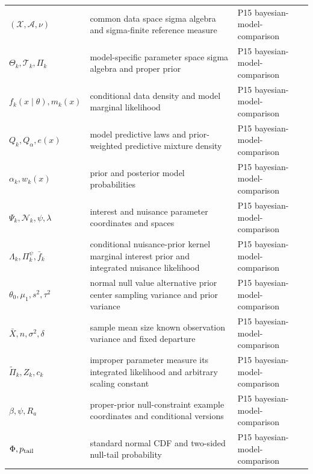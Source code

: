 \begin{longtable}{@{}p{}p{}p{}@{}}
\((\mathcal X,\allowbreak \mathcal A,\allowbreak \nu)\) & common data space sigma algebra and sigma-finite reference measure & P15 bayesian-\allowbreak{}model-\allowbreak{}comparison \\
\(\Theta_k,\allowbreak \mathcal T_k,\allowbreak \Pi_k\) & model-specific parameter space sigma algebra and proper prior & P15 bayesian-\allowbreak{}model-\allowbreak{}comparison \\
\(f_k(x\mid\theta),\allowbreak m_k(x)\) & conditional data density and model marginal likelihood & P15 bayesian-\allowbreak{}model-\allowbreak{}comparison \\
\(Q_k,\allowbreak Q_\alpha,\allowbreak e(x)\) & model predictive laws and prior-weighted predictive mixture density & P15 bayesian-\allowbreak{}model-\allowbreak{}comparison \\
\(\alpha_k,\allowbreak w_k(x)\) & prior and posterior model probabilities & P15 bayesian-\allowbreak{}model-\allowbreak{}comparison \\
\(\Psi_k,\allowbreak \mathcal N_k,\allowbreak \psi,\allowbreak \lambda\) & interest and nuisance parameter coordinates and spaces & P15 bayesian-\allowbreak{}model-\allowbreak{}comparison \\
\(\Lambda_k,\allowbreak \Pi_k^\psi,\allowbreak \bar f_k\) & conditional nuisance-prior kernel marginal interest prior and integrated nuisance likelihood & P15 bayesian-\allowbreak{}model-\allowbreak{}comparison \\
\(\theta_0,\allowbreak \mu_1,\allowbreak s^2,\allowbreak \tau^2\) & normal null value alternative prior center sampling variance and prior variance & P15 bayesian-\allowbreak{}model-\allowbreak{}comparison \\
\(\bar X,\allowbreak n,\allowbreak \sigma^2,\allowbreak \delta\) & sample mean size known observation variance and fixed departure & P15 bayesian-\allowbreak{}model-\allowbreak{}comparison \\
\(\widetilde\Pi_k,\allowbreak Z_k,\allowbreak c_k\) & improper parameter measure its integrated likelihood and arbitrary scaling constant & P15 bayesian-\allowbreak{}model-\allowbreak{}comparison \\
\(\beta,\allowbreak \psi,\allowbreak R_a\) & proper-prior null-constraint example coordinates and conditional versions & P15 bayesian-\allowbreak{}model-\allowbreak{}comparison \\
\(\Phi,\allowbreak p_{\rm tail}\) & standard normal CDF and two-sided null-tail probability & P15 bayesian-\allowbreak{}model-\allowbreak{}comparison \\

\end{longtable}

